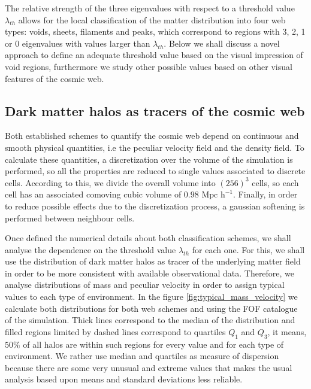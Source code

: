 \documentclass[a4,useAMS,usenatbib,usegraphicx]{latex/mn2e}
\begin{document}
The relative strength of the three eigenvalues with respect to a threshold
value $\lambda_{th}$ allows for the local classification of the matter 
distribution into four web types: voids, sheets, filaments and peaks, 
which correspond to regions with 3, 2, 1 or 0 eigenvalues with values 
larger than $\lambda_{th}$. Below we shall discuss a novel approach to 
define an adequate threshold value based on the visual impression of void
regions, furthermore we study other possible values based on other visual
features of the cosmic web.



\subsection{Dark matter halos as tracers of the cosmic web}
\label{subsec:halos_cosmicweb}


Both established schemes to quantify the cosmic web depend on continuous 
and smooth physical quantities, i.e the peculiar velocity field and the 
density field. To calculate these quantities, a discretization over the 
volume of the simulation is performed, so all the properties are reduced 
to single values associated to discrete cells. According to this, we 
divide the overall volume into $(256)^3$ cells, so each cell has an 
associated comoving cubic volume of $0.98 \mbox{ Mpc h}^{-1}$. Finally, in 
order to reduce possible effects due to the discretization process, a 
gaussian softening is performed between neighbour cells.



Once defined the numerical details about both classification schemes, we
shall analyse the dependence on the threshold value $\lambda_{th}$ for 
each one. For this, we shall use the distribution of dark matter halos as 
tracer of the underlying matter field in order to be more consistent with
available observational data. Therefore, we analyse distributions of mass 
and peculiar velocity in order to assign typical values to each type of 
environment. In the figure \ref{fig:typical_mass_velocity} we calculate 
both distributions for both web schemes and using the FOF catalogue of the 
simulation. Thick lines correspond to the median of the distribution and 
filled regions limited by dashed lines correspond to quartiles $Q_1$ and 
$Q_3$, it means, $50\%$ of all halos are within such regions for every 
\lth value and for each type of environment. We rather use median and 
quartiles as measure of dispersion because there are some very unusual 
and extreme values that makes the usual analysis based upon means and 
standard deviations less reliable.
\end{document}
